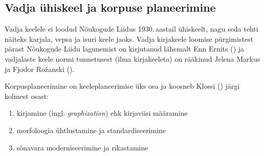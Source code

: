 \documentclass[12pt,a4paper]{article}
\begin{document}





\subsection{Vadja ühiskeel ja korpuse planeerimine}
\label{korpuse-planeerimine}


Vadja keelele ei loodud Nõukogude Liidus 1930.\,aastail ühiskeelt, nagu seda tehti näiteks karjala, vepsa ja isuri keele jaoks. Vadja kirjakeele loomise pürgimistest pärast Nõukogude Liidu lagunemist on kirjutanud lähemalt Enn Ernits (\citeyear{ernits_vadja_2006}) ja vadjalaste keele normi tunnetusest (ilma kirja\-keeleta) on rääkinud Jelena Markus ja Fjodor Rožanski (\cite{markus_concept_2013}). %

Korpusplaneerimine on keele\-planeerimise üks osa ja koosneb Klossi (\citeyear{kloss_research_1970}) järgi kolmest osast:
\begin{enumerate}
\item kirjamine (ingl. \textit{graphization}) ehk kirjaviisi määramine
\item morfoloogia ühtlustamine ja standardiseerimine
\item sõnavara moderniseerimine ja rikastamine
\end{enumerate}
\end{document}
